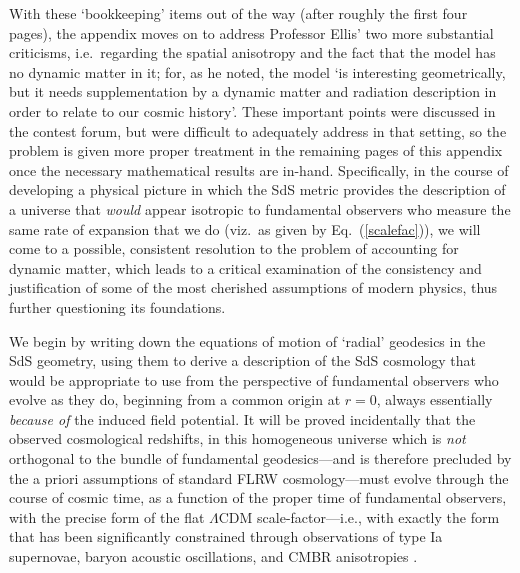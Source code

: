 \documentclass[11pt]{article}
\begin{document}
\begin{appendix}
With these `bookkeeping' items out of the way (after roughly the first four pages), the appendix moves on to address Professor Ellis' two more substantial criticisms, i.e.\ regarding the spatial anisotropy and the fact that the model has no dynamic matter in it; for, as he noted, the model `is interesting geometrically, but it needs supplementation by a dynamic matter and radiation description in order to relate to our cosmic history'. These important points were discussed in the contest forum, but were difficult to adequately address in that setting, so the problem is given more proper treatment in the remaining pages of this appendix once the necessary mathematical results are in-hand. Specifically, in the course of developing a physical picture in which the SdS metric provides the description of a universe that \textit{would} appear isotropic to fundamental observers who measure the same rate of expansion that we do (viz.\ as given by Eq.~(\ref{scalefac})), we will come to a possible, consistent resolution to the problem of accounting for dynamic matter, which leads to a critical examination of the consistency and justification of some of the most cherished assumptions of modern physics, thus further questioning its foundations.

We begin by writing down the equations of motion of `radial' geodesics in the SdS geometry, using them to derive a description of the SdS cosmology that would be appropriate to use from the perspective of fundamental observers who evolve as they do, beginning from a common origin at $r=0$, always essentially \textit{because of} the induced field potential. It will be proved incidentally that the observed cosmological redshifts, in this homogeneous universe which is \textit{not} orthogonal to the bundle of fundamental geodesics---and is therefore precluded by the a priori assumptions of standard FLRW cosmology---must evolve through the course of cosmic time, as a function of the proper time of fundamental observers, with the precise form of the flat $\Lambda$CDM scale-factor---i.e., with exactly the form that has been significantly constrained through observations of type Ia supernovae, baryon acoustic oscillations, and CMBR anisotropies \cite{SNe Ia}.


\end{appendix}
\end{document}
